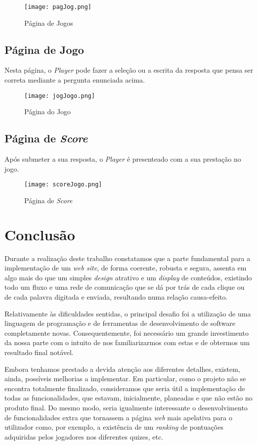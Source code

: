 \documentclass[11pt,a4paper]{report}
\begin{document}
\begin{figure}[h]
    \centering
    \texttt{[image: pagJog.png]}
    \caption{Página de Jogos}
    \label{fig:pagJog}
\end{figure}

\section{Página de Jogo}
Nesta página, o \emph{Player} pode fazer a seleção ou a escrita da resposta que pensa ser correta mediante a pergunta enunciada acima.

\begin{figure}[h]
    \centering
    \texttt{[image: jogJogo.png]}
    \caption{Página do Jogo}
    \label{fig:jogJogo}
\end{figure}

\section{Página de \emph{Score}}
Após submeter a sua resposta, o \emph{Player} é presenteado com a sua prestação no jogo. 

\begin{figure}[h]
    \centering
    \texttt{[image: scoreJogo.png]}
    \caption{Página de \emph{Score}}
    \label{fig:scoreJogo}
\end{figure}

\chapter{Conclusão}

Durante a realização deste trabalho constatamos que a parte fundamental para a implementação de um \emph{web site}, de forma coerente, robusta e segura, assenta em algo mais do que um simples \emph{design} atrativo e um \emph{display} de conteúdos, existindo todo um fluxo e uma rede de comunicação que se dá por trás de cada clique ou de cada palavra digitada e enviada, resultando numa relação causa-efeito.

Relativamente às dificuldades sentidas, o principal desafio foi a utilização de uma linguagem de programação e de ferramentas de desenvolvimento de software completamente novas. Consequentemente, foi necessário um grande investimento da nossa parte com o intuito de nos familiarizarmos com estas e de obtermos um resultado final notável.   

Embora tenhamos prestado a devida atenção aos diferentes detalhes, existem, ainda, possíveis melhorias a implementar. Em particular, como o projeto não se encontra totalmente finalizado, consideramos que seria útil a implementação de todas as funcionalidades, que estavam, inicialmente, planeadas e que não estão no produto final. Do mesmo modo, seria igualmente interessante o desenvolvimento de funcionalidades extra que tornassem a página \emph{web} mais apelativa para o utilizador como, por exemplo, a existência de um \emph{ranking} de pontuações adquiridas pelos jogadores nos diferentes quizes, etc.
\end{document}
